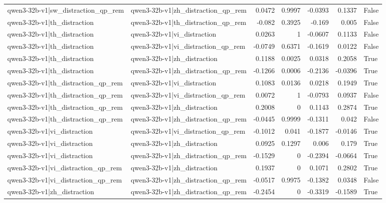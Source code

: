\begin{table}
\begin{tabular}{l l r r r r l}
qwen3-32b-v1|sw_distraction_qp_rem & qwen3-32b-v1|zh_distraction_qp_rem & 0.0472 & 0.9997 & -0.0393 & 0.1337 & False \\
qwen3-32b-v1|th_distraction & qwen3-32b-v1|th_distraction_qp_rem & -0.082 & 0.3925 & -0.169 & 0.005 & False \\
qwen3-32b-v1|th_distraction & qwen3-32b-v1|vi_distraction & 0.0263 & 1 & -0.0607 & 0.1133 & False \\
qwen3-32b-v1|th_distraction & qwen3-32b-v1|vi_distraction_qp_rem & -0.0749 & 0.6371 & -0.1619 & 0.0122 & False \\
qwen3-32b-v1|th_distraction & qwen3-32b-v1|zh_distraction & 0.1188 & 0.0025 & 0.0318 & 0.2058 & True \\
qwen3-32b-v1|th_distraction & qwen3-32b-v1|zh_distraction_qp_rem & -0.1266 & 0.0006 & -0.2136 & -0.0396 & True \\
qwen3-32b-v1|th_distraction_qp_rem & qwen3-32b-v1|vi_distraction & 0.1083 & 0.0136 & 0.0218 & 0.1949 & True \\
qwen3-32b-v1|th_distraction_qp_rem & qwen3-32b-v1|vi_distraction_qp_rem & 0.0072 & 1 & -0.0793 & 0.0937 & False \\
qwen3-32b-v1|th_distraction_qp_rem & qwen3-32b-v1|zh_distraction & 0.2008 & 0 & 0.1143 & 0.2874 & True \\
qwen3-32b-v1|th_distraction_qp_rem & qwen3-32b-v1|zh_distraction_qp_rem & -0.0445 & 0.9999 & -0.1311 & 0.042 & False \\
qwen3-32b-v1|vi_distraction & qwen3-32b-v1|vi_distraction_qp_rem & -0.1012 & 0.041 & -0.1877 & -0.0146 & True \\
qwen3-32b-v1|vi_distraction & qwen3-32b-v1|zh_distraction & 0.0925 & 0.1297 & 0.006 & 0.179 & True \\
qwen3-32b-v1|vi_distraction & qwen3-32b-v1|zh_distraction_qp_rem & -0.1529 & 0 & -0.2394 & -0.0664 & True \\
qwen3-32b-v1|vi_distraction_qp_rem & qwen3-32b-v1|zh_distraction & 0.1937 & 0 & 0.1071 & 0.2802 & True \\
qwen3-32b-v1|vi_distraction_qp_rem & qwen3-32b-v1|zh_distraction_qp_rem & -0.0517 & 0.9975 & -0.1382 & 0.0348 & False \\
qwen3-32b-v1|zh_distraction & qwen3-32b-v1|zh_distraction_qp_rem & -0.2454 & 0 & -0.3319 & -0.1589 & True \\
\bottomrule
\end{tabular}
\end{table}
